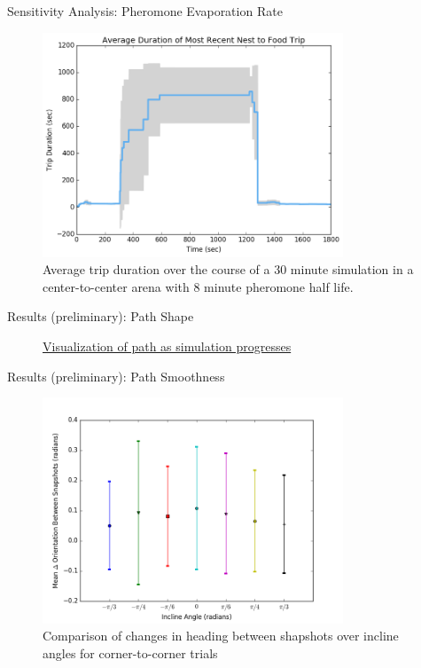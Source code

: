 \begin{frame}{Sensitivity Analysis: Pheromone Evaporation Rate}
	\begin{figure}
	\includegraphics[width=0.8\textwidth]{results/center-to-center-average-trip-duration-8xpheromone.png}
	\caption{Average trip duration over the course of a 30 minute simulation in a center-to-center arena with 8 minute pheromone half life.}
	\end{figure}
\end{frame}

\begin{frame}{Results (preliminary): Path Shape}
\begin{figure}
	\begin{center}
	\end{center}
	\caption{\href{http://www.youtube.com/v/QeSErcTOLbY?rel=0&amp;showinfo=0}{Visualization of path as simulation progresses}}
\end{figure}
\end{frame}

\begin{frame}{Results (preliminary): Path Smoothness}
\begin{figure}
\includegraphics[width=0.8\textwidth]{results/corner-to-corner_meandeltaorientationbetweensnapshots.png}
\caption{Comparison of changes in heading between shapshots over incline angles for corner-to-corner trials}
\end{figure}
\end{frame}


